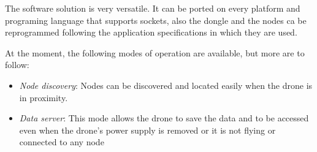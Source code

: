 The software solution is very versatile. It can be ported on every platform and 
programing language that supports sockets, also the dongle and the nodes ca be
reprogrammed following the application specifications in which they are used.
 
At the moment, the following modes of operation are available, but more are to follow:

\begin{itemize}

\item \textit{Node discovery}: Nodes can be discovered and located easily when the drone
is in proximity.

\item \textit{Data server}: This mode allows the drone to save the data and to
be accessed even when the drone's power supply is removed or it is not flying 
or connected to any node 

 \end{itemize}

 

